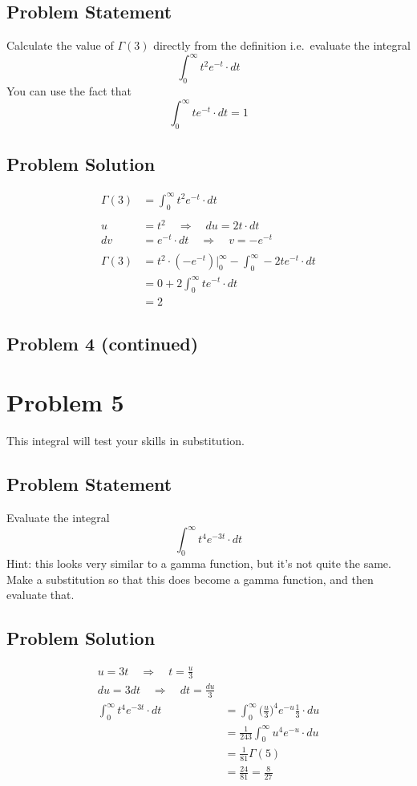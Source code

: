 \documentclass[12pt]{article}
\theoremstyle{definition}
\begin{document}
\subsection*{Problem Statement}

Calculate the value of $\Gamma(3)$ directly from the definition i.e.\ evaluate the integral
$$
\int_0^\infty t^2 e^{-t} \cdot dt
$$
You can use the fact that
$$
\int_0^\infty t e^{-t} \cdot dt = 1
$$

\subsection*{Problem Solution}
\begin{align*}
\Gamma(3) &= \int_0^\infty t^2 e^{-t} \cdot dt\\\\
u &= t^2 \quad\Rightarrow\quad du = 2t \cdot dt\\
dv &= e^{-t} \cdot dt \quad\Rightarrow\quad v = -e^{-t}\\\\
\Gamma(3) &=  t^{2} \cdot (-e^{-t})\biggr\rvert_0^{\infty} - \int_0^\infty -2te^{-t} \cdot dt\\
&= 0 + 2\int_0^\infty te^{-t} \cdot dt\\
&= 2
\end{align*}

\newpage
\subsection*{Problem 4 (continued)}


\newpage
\section*{Problem 5}

This integral will test your skills in substitution.

\subsection*{Problem Statement}

Evaluate the integral
$$
\int_0^\infty t^4 e^{-3t} \cdot dt
$$
Hint: this looks very similar to a gamma function, but it's not quite the same. Make a substitution so that this does become a gamma function, and then evaluate that.

\subsection*{Problem Solution}
\begin{align*}
u = 3t \quad\Rightarrow\quad t = \frac{u}{3}\\
du = 3dt \quad\Rightarrow\quad dt = \frac{du}{3}\\
\int_0^\infty t^4 e^{-3t} \cdot dt &= \int_0^\infty \biggr(\frac{u}{3}\biggr)^4 e^{-u} \frac{1}{3}\cdot du\\
&= \frac{1}{243}\int_0^\infty u^4 e^{-u}\cdot du\\
&= \frac{1}{81} \Gamma(5)\\
& = \frac{24}{81} = \frac{8}{27}
\end{align*}
\end{document}

